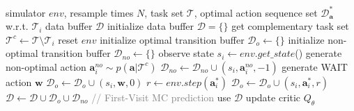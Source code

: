 \documentclass[11pt]{article}
\theoremstyle{plain}
\theoremstyle{remark}
\begin{document}
\begin{algorithm}[h!]
   \caption{Data collection for task $\mathcal{T}_i$}
   \label{alg:data_collection}
\begin{algorithmic}
    simulator $env$, resample times $N$, task set $\mathcal{T}$, optimal action sequence set $\mathcal{D}^{*}_{\mathbf{a}}$ w.r.t. $\mathcal{T}_i$
    data buffer $\mathcal{D}$
   \STATE initialize data buffer $\mathcal{D} = \{\}$
   \STATE get complementary task set $\mathcal{T}^c \leftarrow \mathcal{T} \setminus \mathcal{T}_i$
   \STATE reset $env$
   \STATE initialize optimal transition buffer $\mathcal{D}_{o} \leftarrow \{\}$
   \STATE initialize non-optimal transition buffer $\mathcal{D}_{no} \leftarrow \{\}$ 
   \STATE observe state $s_i \leftarrow env.get\_state$()
   \STATE generate non-optimal action $\mathbf{a}_{i}^{no} \sim p(\mathbf{a}|\mathcal{T}^c)$
   \STATE $\mathcal{D}_{no} \leftarrow \mathcal{D}_{no} \cup (s_i, \mathbf{a}^{no}_{i}, -1)$
   \STATE generate WAIT action $\mathbf{w}$
   \STATE $\mathcal{D}_{o} \leftarrow \mathcal{D}_{o} \cup (s_i, \mathbf{w}, 0)$
   \STATE $r \leftarrow env.step(\mathbf{a}_{i}^{*})$
   \STATE $\mathcal{D}_{o} \leftarrow \mathcal{D}_{o} \cup (s_i, \mathbf{a}^{*}_{i}, r)$
   \ENDFOR
   \STATE $\mathcal{D}\gets \mathcal{D} \cup \mathcal{D}_o \cup \mathcal{D}_{no}$
   \STATE \textcolor{gray}{// First-Visit MC prediction}
   \STATE use $\mathcal{D}$ update critic $Q_\theta$
   \ENDFOR
   \ENDFOR
\end{algorithmic}
\end{algorithm}
\fi 
\vspace{2em}
\end{document}
